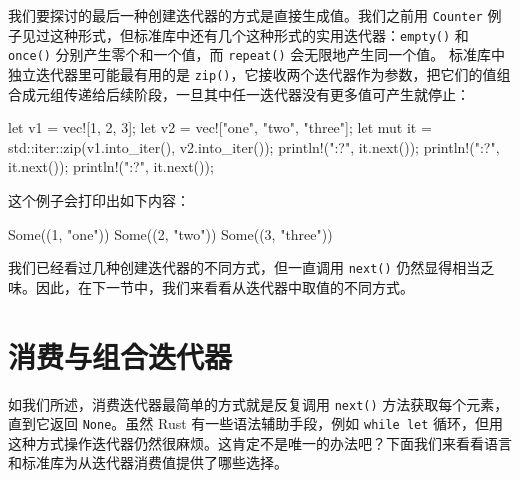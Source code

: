 我们要探讨的最后一种创建迭代器的方式是直接生成值。我们之前用 \texttt{Counter} 例子见过这种形式，但标准库中还有几个这种形式的实用迭代器：\texttt{empty()} 和 \texttt{once()} 分别产生零个和一个值，而 \texttt{repeat()} 会无限地产生同一个值。
标准库中独立迭代器里可能最有用的是 \texttt{zip()}，它接收两个迭代器作为参数，把它们的值组合成元组传递给后续阶段，一旦其中任一迭代器没有更多值可产生就停止：
\begin{codebox}[rust]
let v1 = vec![1, 2, 3];
let v2 = vec!["one", "two", "three"];
let mut it = std::iter::zip(v1.into_iter(), v2.into_iter());
println!("{:?}", it.next());
println!("{:?}", it.next());
println!("{:?}", it.next());
\end{codebox}
\label{idx:idx_d85536ab}
这个例子会打印出如下内容：
\begin{codeboxdark}
Some((1, "one"))
Some((2, "two"))
Some((3, "three"))
\end{codeboxdark}
我们已经看过几种创建迭代器的不同方式，但一直调用 \texttt{next()} 仍然显得相当乏味。因此，在下一节中，我们来看看从迭代器中取值的不同方式。
\section{消费与组合迭代器}
\label{idx:idx_1d6e552e}
\label{idx:idx_9060ecfb}
如我们所述，消费迭代器最简单的方式就是反复调用 \texttt{next()} 方法获取每个元素，直到它返回 \texttt{None}。虽然 Rust 有一些语法辅助手段，例如 \texttt{while let} 循环，但用这种方式操作迭代器仍然很麻烦。这肯定不是唯一的办法吧？下面我们来看看语言和标准库为从迭代器消费值提供了哪些选择。

